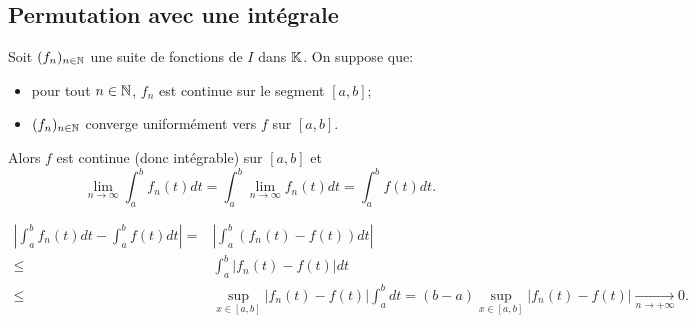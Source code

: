 \documentclass{book}
\newcommand{\fn}{(f_n)_{n\in \N   }}
\begin{document}
\subsection{Permutation avec une intégrale}\label{sec:perm-int}

\begin{Theoreme}
Soit $\fn$ une suite de fonctions de $I$ dans $\mathbb{K}  $.
On suppose que:
\begin{itemize}
\item
  pour tout $n\in \mathbb{N}   $, $f_n$ est continue sur le segment $[a,b]$;
\item
  $\fn$ converge uniformément vers $f$ sur $[a,b]$.
\end{itemize}
Alors $f$ est continue (donc intégrable) sur $[a,b]$ et
\[  \lim\limits_{n \to \infty} \int_a^b f_n(t)dt = \int_a^b \lim\limits_{n \to \infty} f_n(t)dt = \int_a^b f(t)dt. \]
\end{Theoreme}
\begin{Demonstration}
$$\begin{aligned}
\left|\int_a^b f_n(t)dt -\int_a^b f(t)dt\right|=&\left|\int_a^b (f_n(t)-f(t))dt\right|\\
\leq&\int_a^b\left|f_n(t)-f(t)\right|dt\\
\leq &\sup_{x\in[a,b]}\left|f_n(t)-f(t)\right|\int_a^b dt=(b-a) \sup_{x\in[a,b]}\left|f_n(t)-f(t)\right|  \xrightarrow[n\to+\infty ]{}0.
\end{aligned}$$ 
\end{Demonstration}
\end{document}
